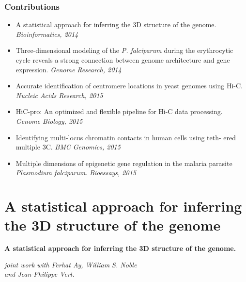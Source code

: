 \documentclass[xcolor=dvipsnames]{beamer}
\begin{document}
\begin{frame}
\frametitle{Contributions}
\begin{itemize}[label={$\bullet$}]
\item<1-> A statistical approach for inferring the 3D structure of the
genome. \textit{Bioinformatics, 2014}
\item<2-> Three-dimensional modeling of the {\em P. falciparum} during the
erythrocytic cycle reveals a strong connection between genome architecture and
gene expression. \textit{Genome Research, 2014}
\item<3-> Accurate identification of centromere locations in yeast genomes using
Hi-C. \textit{Nucleic Acids Research, 2015}
\end{itemize}

\begin{itemize}[label={$\circ$}]
\item<4-> HiC-pro: An optimized and flexible pipeline for Hi-C data
processing. \textit{Genome Biology, 2015}
\item<5-> Identifying multi-locus chromatin contacts in human cells using teth-
ered multiple 3C. \textit{BMC Genomics, 2015}
\item<6-> Multiple dimensions of epigenetic gene regulation in the malaria
parasite {\em Plasmodium falciparum}.
\textit{Bioessays, 2015}
\end{itemize}
\end{frame}





\section{A statistical approach for inferring the 3D structure of the genome}

\begin{frame}
\Large{ \bf
A statistical approach for inferring the 3D structure of the genome.}

\begin{flushright}
\vspace{1em}
\small
\textit{joint work with 
Ferhat Ay, William S. Noble \\ and Jean-Philippe Vert.}
\end{flushright}
\end{frame}
\end{document}

